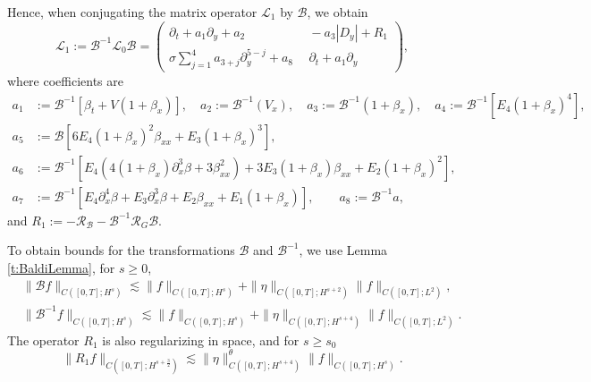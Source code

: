 \documentclass[12pt]{amsart}
\theoremstyle{remark}
\theoremstyle{definition}
\numberwithin{equation}{section}
\newcommand{\p}{\partial}
\newcommand{\f}{\frac}
\newcommand{\mB}{\mathcal{B}}
\newcommand{\mL}{\mathcal{L}}
\newcommand{\mR}{\mathcal{R}}
\renewcommand{\b}{\beta}
\newcommand{\inv}{^{-1}}
\begin{document}
Hence, when conjugating the matrix operator $\mL_1$ by $\mB$, we obtain
\begin{equation} \label{LOneMatrix}
\mL_1 := \mB\inv \mL_0 \mB 
= \begin{pmatrix}
 \p_t + a_1 \p_y + a_2  \  & \ - a_3 |D_y| + R_1 \\ 
\sigma \sum_{j= 1}^4 a_{3+j}\p_y^{5-j} + a_8 \ & \  \p_t + a_1 \p_y
\end{pmatrix},    
\end{equation}
where coefficients are 
\begin{align*}
a_1 & := \mB\inv [  \b_t + V(1 + \b_x)], \quad 
a_2  := \mB\inv(V_x),  \quad
a_3  := \mB\inv(1 + \b_x), \quad 
a_4  := \mB\inv [E_4(1 + \b_x)^4], \\
a_5 & :=\mB\left[6E_4(1 + \b_x)^2\b_{xx}+E_3(1+\beta_x)^3\right],\\
a_6 & := \mB\inv\left[E_4\left(4(1+\beta_x)\p^3_x\beta+3\beta^2_{xx}\right)+3E_3(1+\beta_x)\beta_{xx}+E_2(1+\beta_x)^2\right],  \\
a_7 & :=\mB\inv\left[E_4\p_x^4\beta+E_3\p_x^3\beta+E_2\beta_{xx}+E_1(1+\beta_x)\right], \qquad 
a_8  := \mB\inv a,
\end{align*}
and $R_1 := - \mR_\mB - \mB\inv \mR_G \mB$.

To obtain bounds for the transformations $\mB$ and $\mB^{-1}$, we use Lemma \ref{t:BaldiLemma}, for $ s\geq 0$,
\begin{align}
 &\|\mB f \|_{C([0,T];H^s)}   \lesssim \|f\|_{C([0,T];H^s)} + \|\eta\|_{C([0,T];H^{s+2})}\|f\|_{C([0,T];L^2)},  \label{BBInverseBound}\\
 &\|\mB^{-1} f \|_{C([0,T];H^s)}   \lesssim \|f\|_{C([0,T];H^s)} + \|\eta\|_{C([0,T];H^{s+4})}\|f\|_{C([0,T];L^2)}.  \label{BBInvBoundTwo}
\end{align}
The operator $R_1$ is also regularizing in space, and for $s \geq s_0$
\begin{equation*}
\|R_{1} f \|_{C([0,T];H^{s+\f32})} \lesssim \|\eta\|^\theta_{C([0,T];H^{s+4})} \|f\|_{C([0,T];H^s)}.
\end{equation*}
\end{document}

